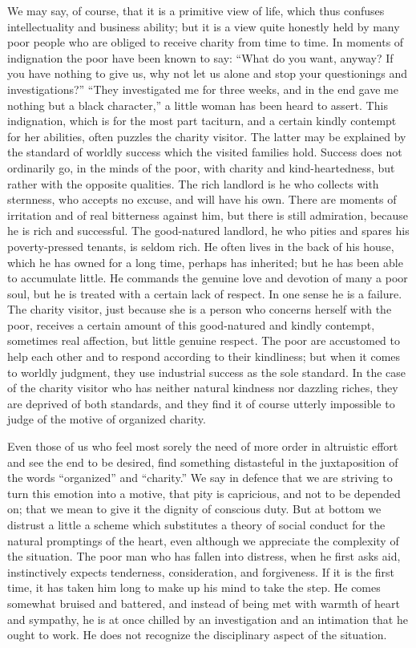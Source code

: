 \documentclass[]{article}
\begin{document}
\begin{sectionbody}
\addamsparagraph We may say, of course, that it is a primitive view of life, which thus
confuses intellectuality and business ability; but it is a view quite
honestly held by many poor people who are obliged to receive charity
from time to time. In moments of indignation the poor have been known to
say: ``What do you want, anyway? If you have nothing to give us, why not
let us alone and stop your questionings and investigations?'' ``They
investigated me for three weeks, and in the end gave me nothing but a
black character,'' a little woman has been heard to assert. This
indignation, which is for the most part taciturn, and a certain kindly
contempt for her abilities, often puzzles the charity visitor. The
latter may be explained by the standard of worldly success which the
visited families hold. Success does not ordinarily go, in the minds of
the poor, with charity and kind-heartedness, but rather with the
opposite qualities. The rich landlord is he who collects with sternness,
who accepts no excuse, and will have his own. There are moments of
irritation and of real bitterness against him, but there is still
admiration, because he is rich and successful. The good-natured
landlord, he who pities and spares his poverty-pressed tenants, is
seldom rich. He often lives in the back of his house, which he has owned
for a long time, perhaps has inherited; but he has been able to
accumulate little. He commands the genuine love and devotion of many a
poor soul, but he is treated with a certain lack of respect. In one
sense he is a failure. The charity visitor, just because she is a person
who concerns herself with the poor, receives a certain amount of this
good-natured and kindly contempt, sometimes real affection, but little
genuine respect. The poor are accustomed to help each other and to
respond according to their kindliness; but when it comes to worldly
judgment, they use industrial success as the sole standard. In the case
of the charity visitor who has neither natural kindness nor dazzling
riches, they are deprived of both standards, and they find it of course
utterly impossible to judge of the motive of organized charity.

\addamsparagraph Even those of us who feel most sorely the need of more order in
altruistic effort and see the end to be desired, find something
distasteful in the juxtaposition of the words ``organized'' and ``charity.''
We say in defence that we are striving to turn this emotion into a
motive, that pity is capricious, and not to be depended on; that we mean
to give it the dignity of conscious duty. But at bottom we distrust a
little a scheme which substitutes a theory of social conduct for the
natural promptings of the heart, even although we appreciate the
complexity of the situation. The poor man who has fallen into distress,
when he first asks aid, instinctively expects tenderness, consideration,
and forgiveness. If it is the first time, it has taken him long to make
up his mind to take the step. He comes somewhat bruised and battered,
and instead of being met with warmth of heart and sympathy, he is at
once chilled by an investigation and an intimation that he ought to
work. He does not recognize the disciplinary aspect of the situation.


\end{sectionbody}
\end{document}
